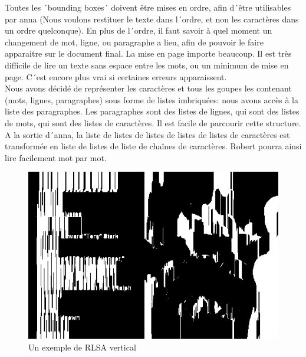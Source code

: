 Toutes les ´bounding boxes´ doivent être mises en ordre, afin d´être utilisables par anna (Nous voulons restituer le texte dans l´ordre, et non les caractères dans un ordre quelconque). En plus de l´ordre, il faut savoir à quel moment un changement de mot, ligne, ou paragraphe a lieu, afin de pouvoir le faire apparaitre sur le document final. La mise en page importe beaucoup. Il est très difficile de lire un texte sans espace entre les mots, ou un minimum de mise en page. C´est encore plus vrai si certaines erreurs apparaissent.\\
Nous avons décidé de représenter les caractères et tous les goupes les contenant (mots, lignes, paragraphes) sous forme de listes imbriquées: nous avons accès à la liste des paragraphes. Les paragraphes sont des listes de lignes, qui sont des listes de mots, qui sont des listes de caractères. Il est facile de parcourir cette structure. A la sortie d´anna, la liste de listes de listes de listes de listes de caractères est transformée en liste de listes de liste de chaînes de caractères. Robert pourra ainsi lire facilement mot par mot.

\begin{figure}[h!]
  \centering
  \includegraphics[scale=1]{chapters/Pictures/vrlsa.png}
  \caption{Un exemple de RLSA vertical}
\end{figure}

\begin{center}
\end{center}
